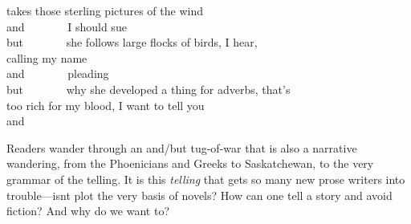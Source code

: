 takes those sterling pictures of the wind\\
\hspace*{0.333em}and~ ~~~~~~I should sue\\
\hspace*{0.333em}but~ ~~~~~~she follows large flocks of birds, I hear,\\
\hspace*{0.333em}\hspace*{0.333em}\hspace*{0.333em}\hspace*{0.333em}\hspace*{0.333em}\hspace*{0.333em}\hspace*{0.333em}\hspace*{0.333em}\hspace*{0.333em}\hspace*{0.333em}\hspace*{0.333em}\hspace*{0.333em}\hspace*{0.333em}
calling my name\\
\hspace*{0.333em}and~ ~~~~~~pleading\\
\hspace*{0.333em}but~ ~~~~~~why she developed a thing for adverbs,
that's\\
\hspace*{0.333em}\hspace*{0.333em}\hspace*{0.333em}\hspace*{0.333em}\hspace*{0.333em}\hspace*{0.333em}\hspace*{0.333em}\hspace*{0.333em}\hspace*{0.333em}\hspace*{0.333em}\hspace*{0.333em}\hspace*{0.333em}\hspace*{0.333em}
too rich for my blood, I want to tell you\\
\hspace*{0.333em}and

Readers wander through an and/but tug-of-war that is also a narrative
wandering, from the Phoenicians and Greeks to Saskatchewan, to the very
grammar of the telling. It is this \emph{telling} that gets so many new
prose writers into trouble---isnt plot the very basis of novels? How can
one tell a story and avoid fiction? And why do we want to?

